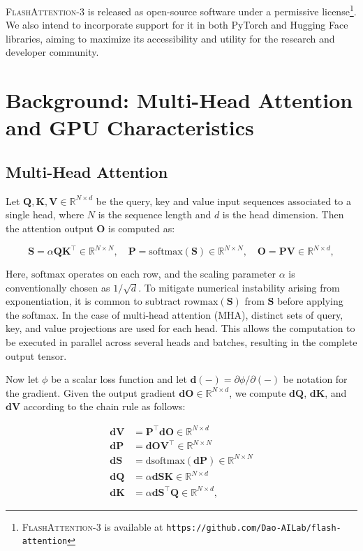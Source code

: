 \textsc{FlashAttention-3} is released as open-source software under a permissive license\footnote{\textsc{FlashAttention-3}
  is available at \texttt{https://github.com/Dao-AILab/flash-attention}}. We also intend to incorporate support for it in both PyTorch and Hugging Face libraries, aiming to maximize its accessibility and utility for the research and developer community.

\section{Background: Multi-Head Attention and GPU Characteristics}
\label{sec:background}

\subsection{Multi-Head Attention}
\label{subsec:multi_head_attn}

Let $\mathbf{Q}, \mathbf{K}, \mathbf{V} \in \mathbb{R}^{N \times d}$ be the query, key and value input sequences associated to a single head, where $N$ is the sequence length and $d$ is the head dimension. Then the attention output $\mathbf{O}$ is computed as:

\begin{equation*}
  \mathbf{S} = \alpha \mathbf{Q} \mathbf{K}^\top \in \mathbb{R}^{N \times N}, \quad \mathbf{P} = \mathrm{softmax}(\mathbf{S}) \in \mathbb{R}^{N \times N}, \quad \mathbf{O} = \mathbf{P}\mathbf{V} \in \mathbb{R}^{N \times d},
\end{equation*}

Here, $\mathrm{softmax}$ operates on each row, and the scaling parameter $\alpha$ is conventionally chosen as $1/\sqrt{d}$. To mitigate numerical instability arising from exponentiation, it is common to subtract $\mathrm{rowmax}(\mathbf{S})$ from $\mathbf{S}$ before applying the softmax. In the case of multi-head attention (MHA), distinct sets of query, key, and value projections are used for each head. This allows the computation to be executed in parallel across several heads and batches, resulting in the complete output tensor.

Now let $\phi$ be a scalar loss function and let $\mathbf{d}(-) = \partial \phi / \partial (-)$ be notation for the gradient. Given the output gradient $\mathbf{dO} \in \mathbb{R}^{N \times d}$, we compute $\mathbf{dQ}$, $\mathbf{dK}$, and $\mathbf{dV}$ according to the chain rule as follows:

\begin{align*}
  \mathbf{dV} &= \mathbf{P}^\top \mathbf{dO} \in \mathbb{R}^{N \times d} \\
  \mathbf{dP} &= \mathbf{dO} \mathbf{V}^\top \in \mathbb{R}^{N \times N} \\
  \mathbf{dS} &= \mathrm{dsoftmax} (\mathbf{dP}) \in \mathbb{R}^{N \times N} \\
  \mathbf{dQ} &= \alpha \mathbf{dS} \mathbf{K} \in \mathbb{R}^{N \times d} \\
  \mathbf{dK} &= \alpha \mathbf{dS}^\top \mathbf{Q} \in \mathbb{R}^{N \times d},
\end{align*}


